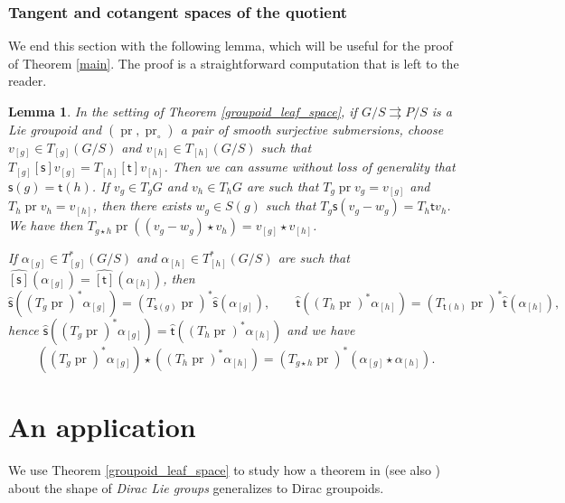 \documentclass{amsart}
\newtheorem{lemma}[theorem]{Lemma}
\theoremstyle{definition}
\begin{document}
\subsubsection*{\textbf{Tangent and cotangent spaces of the quotient}}
We end this section with the  following lemma, which will be useful for the proof
of Theorem \ref{main}. The proof is a straightforward computation that is left to the reader.
\begin{lemma}\label{tangent_cotangent_structures}
In the setting of Theorem \ref{groupoid_leaf_space}, if 
$G/S{{\rightrightarrows}} P/S$ is a Lie groupoid and 
$(\operatorname{pr},\operatorname{pr}_\circ)$ a pair of smooth surjective submersions, choose
$v_{[g]}\in T_{[g]}(G/S)$
and $v_{[h]}\in T_{[h]}(G/S)$  such that 
$T_{[g]}[{{\mathsf{s}}}] v_{[g]}=T_{[h]}[{{\mathsf{t}}}] v_{[h]}$.
Then we can assume without loss of generality that ${{\mathsf{s}}}(g)={{\mathsf{t}}}(h)$.
If
$v_g\in T_gG$ and $v_h\in T_hG$ are such that 
$T_g\operatorname{pr} v_g=v_{[g]}$ and $T_h\operatorname{pr} v_h=v_{[h]}$, then there exists
$w_g\in S(g)$ such that $T_g{{\mathsf{s}}}(v_g-w_g)=T_h{{\mathsf{t}}} v_h$.
We have then $T_{g\star h}\operatorname{pr}((v_g-w_g)\star v_h)=v_{[g]}\star v_{[h]}$.

If $\alpha_{[g]}\in T_{[g]}^*(G/S)$
and $\alpha_{[h]}\in T_{[h]}^*(G/S)$  are  such that 
$\hat{[{{\mathsf{s}}}]}(\alpha_{[g]})=\hat{[{{\mathsf{t}}}]}(\alpha_{[h]})$, then 
$$\hat{{\mathsf{s}}}((T_g\operatorname{pr})^*\alpha_{[g]})=(T_{{{\mathsf{s}}}(g)}\operatorname{pr})^*\hat{{\mathsf{s}}}(\alpha_{[g]}), \qquad 
\hat{{\mathsf{t}}}((T_h\operatorname{pr})^*\alpha_{[h]})=(T_{{{\mathsf{t}}}(h)}\operatorname{pr})^*\hat{{\mathsf{t}}}(\alpha_{[h]}),$$
hence 
$\hat{{\mathsf{s}}}\left((T_g\operatorname{pr})^*\alpha_{[g]}\right)
=\hat{{\mathsf{t}}}\left((T_h\operatorname{pr})^*\alpha_{[h]}\right)$
and we have 
$$((T_g\operatorname{pr})^*\alpha_{[g]})\star( (T_h\operatorname{pr})^*\alpha_{[h]})
=(T_{g\star h}\operatorname{pr})^*(\alpha_{[g]}\star \alpha_{[h]}).$$
\end{lemma}

\section{An application} 
We use Theorem \ref{groupoid_leaf_space}
to study how a theorem in \cite{Ortiz08} (see also \cite{Jotz11a})
about the shape of \emph{Dirac Lie groups}
generalizes to Dirac groupoids.

\bigskip
\end{document}
